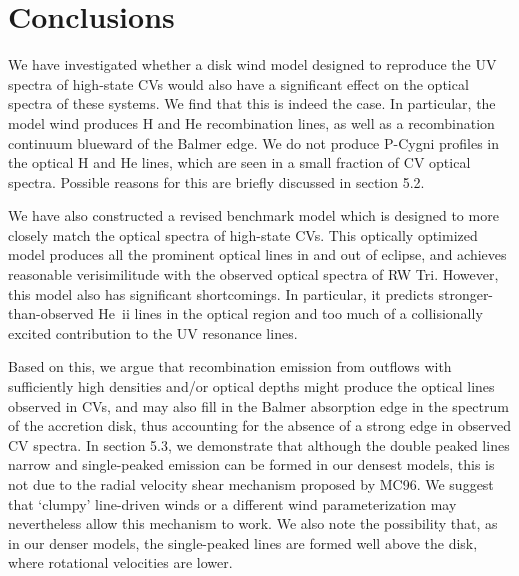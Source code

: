 \documentclass[preprint, a4paper, 11pt]{aastex}
\begin{document}





%
%


\section{Conclusions}

We have investigated whether a disk wind model designed to reproduce
the UV spectra of high-state CVs would also have a significant effect
on the optical spectra of these systems. We find that this is indeed
the case. In particular, the model wind produces H and He
recombination lines, as well as a recombination continuum blueward of
the Balmer edge. We do not produce P-Cygni profiles
in the optical H and He lines, 
which are seen in a small fraction of CV optical spectra.
Possible reasons for this are briefly discussed in section 
5.2.

We have also constructed a revised benchmark model which is designed
to more closely match the optical spectra of high-state CVs. This
optically optimized model produces all the prominent optical lines in
and out of eclipse, and achieves reasonable verisimilitude with the
observed optical spectra of RW Tri. However, this model also has
significant shortcomings. In particular, it predicts
stronger-than-observed He~{\sc ii} lines in the optical region and too
much of a collisionally excited contribution to the UV resonance lines. 

Based on this, we argue that recombination emission 
from outflows with sufficiently high densities and/or optical depths 
might produce the optical lines observed in CVs, and may also 
fill in the Balmer absorption edge in the spectrum of the accretion disk, 
thus accounting for the absence of a strong edge in observed CV spectra.
In section 5.3, we demonstrate that
although the double peaked lines narrow and 
single-peaked emission can be formed in our densest models, 
this is not due to the radial velocity shear mechanism proposed by MC96.
We suggest that `clumpy' line-driven winds or a different
wind parameterization may nevertheless allow this mechanism to work.
We also note the possibility that, as in our denser models, 
the single-peaked lines are formed well above the disk, where 
rotational velocities are lower.
\end{document}

